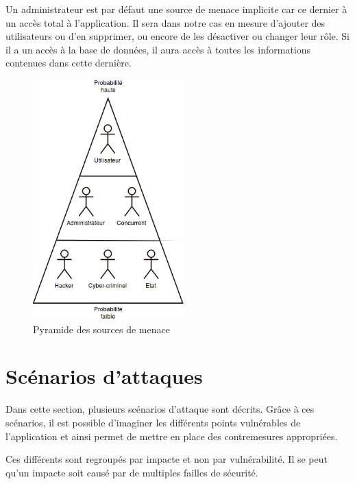 \documentclass[12pt]{article}
\begin{document}
Un administrateur est par défaut une source de menace implicite car ce dernier à un accès total à l'application. Il sera dans notre cas en mesure d'ajouter des utilisateurs ou d'en supprimer, ou encore de les désactiver ou changer leur rôle. Si il a un accès à la base de données, il aura accès à toutes les informations contenues dans cette dernière.
\\


\begin{figure}[h]
 	\center
	\includegraphics[width=220px]{pyramid}
 	\caption{Pyramide des sources de menace} 
 	\label{flux}	
\end{figure}


\newpage
\section{Scénarios d'attaques}

Dans cette section, plusieurs scénarios d'attaque sont décrits. Grâce à ces scénarios, il est possible d'imaginer les différents points vulnérables de l'application et ainsi permet de mettre en place des contremesures appropriées.

Ces différents sont regroupés par impacte et non par vulnérabilité. Il se peut qu'un impacte soit causé par de multiples failles de sécurité.
\end{document}
